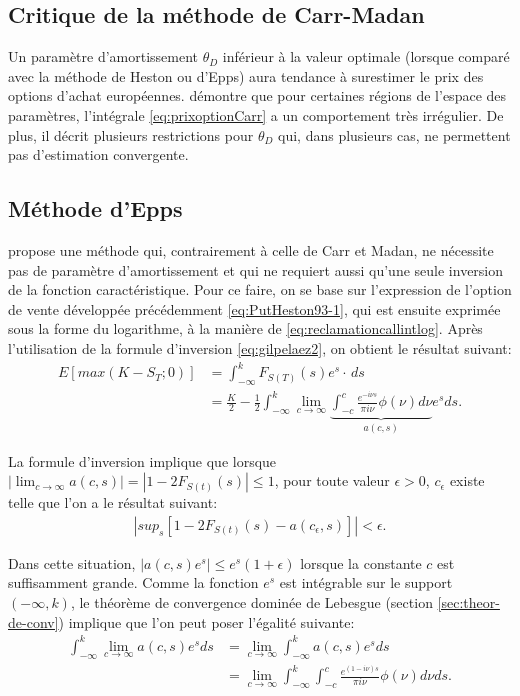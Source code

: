 \subsection{Critique de la méthode de Carr-Madan}
\label{sec:critiquecarrmadanfft}

Un paramètre d'amortissement $\theta_{D}$ inférieur à la valeur
optimale (lorsque comparé avec la méthode de Heston ou d’Epps) aura
tendance à surestimer le prix des options d'achat
européennes. \cite{itkin2005pricing} démontre que pour certaines
régions de l'espace des paramètres, l'intégrale
\eqref{eq:prixoptionCarr} a un comportement très irrégulier. De plus,
il décrit plusieurs restrictions pour $\theta_{D}$ qui, dans plusieurs
cas, ne permettent pas d'estimation convergente.

\subsection{Méthode d’Epps}
\label{sec:epps2007}

\cite{epps2007pricing} propose une méthode qui, contrairement à celle
de Carr et Madan, ne nécessite pas de paramètre d'amortissement et qui
ne requiert aussi qu'une seule inversion de la fonction
caractéristique. Pour ce faire, on se base sur l'expression de
l'option de vente développée précédemment \eqref{eq:PutHeston93-1}, qui
est ensuite exprimée sous la forme du logarithme, à la manière de
\eqref{eq:reclamationcallintlog}.  Après l'utilisation de la formule
d'inversion \eqref{eq:gilpelaez2}, on obtient le résultat suivant:
\begin{align}
  \label{eq:putepps-1}
  E\left[max(K-S_T;0) \right] &= \int_{-\infty}^{k} {F}_{S(T)}(s)e^s\cdot\,ds \nonumber\\
  &= \frac{K}{2}-\frac{1}{2}\int_{-\infty}^{k} \lim_{c\to\infty}
  \underbrace{\int_{-c}^{c} \frac{e^{-i\nu s}}{\pi
      i\nu}\phi(\nu)d\nu}_{a(c,s)}e^sds.
\end{align}

La formule d'inversion implique que lorsque $|\lim_{c\to\infty}
a(c,s)| = |1-2{F}_{S(t)}(s)|\leq 1$, pour toute valeur $\epsilon>0$,
$c_{\epsilon}$ existe telle que l'on a le résultat suivant:
\begin{align}
  \label{eq:putepps-resultat1}
  |sup_s\left[1-2{F}_{S(t)}(s)-a(c_{\epsilon},s) \right]|<\epsilon.
\end{align}

Dans cette situation, $|a(c,s)e^s|\leq e^s(1+\epsilon)$ lorsque la
constante $c$ est suffisamment grande. Comme la fonction $e^s$ est
intégrable sur le support $(-\infty,k)$, le théorème de convergence
dominée de Lebesgue (section \ref{sec:theor-de-conv}) implique que
l'on peut poser l'égalité suivante:
\begin{align}
  \int_{-\infty}^{k} \lim_{c\to\infty} a(c,s)e^sds &= \lim_{c\to\infty}\int_{-\infty}^{k}  a(c,s)e^sds \nonumber\\
  &= \lim_{c\to\infty} \int_{-\infty}^{k}\int_{-c}^{c}
  \frac{e^{(1-i\nu) s}}{\pi i\nu}\phi(\nu)d\nu ds. \nonumber
\end{align}

